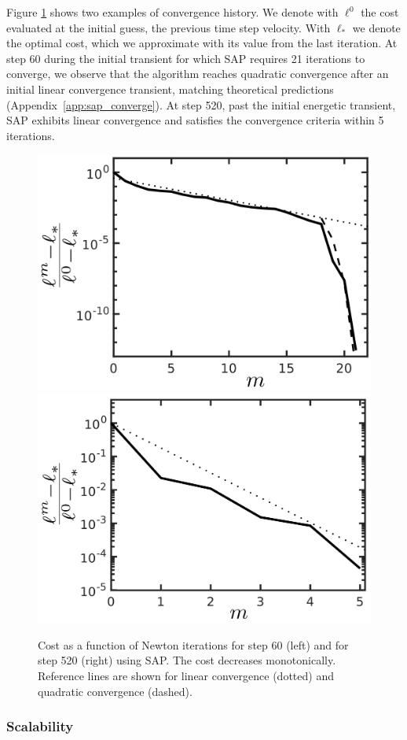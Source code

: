 Figure \ref{fig:clutter_line_search} shows two examples of convergence history.
We denote with $\ell^0$ the cost evaluated at the initial guess, the previous
time step velocity. With $\ell_*$ we denote the optimal cost, which we
approximate with its value from the last iteration. At step 60 during the
initial transient for which SAP requires 21 iterations to converge, we observe
that the algorithm reaches quadratic convergence after an initial linear
convergence transient, matching theoretical predictions
(Appendix~\ref{app:sap_converge}). At step 520, past the initial energetic
transient, SAP exhibits linear convergence and satisfies the convergence
criteria within 5 iterations.
\begin{figure}[!h]
	\centering
    \includegraphics[height=0.34\columnwidth]{figures/clutter/normalized_cost_step60_21its_wwalls_latex_labels.png}
	\includegraphics[height=0.34\columnwidth]{figures/clutter/normalized_cost_step520_5its_wwalls_latex_labels.png}    
	\caption{\label{fig:clutter_line_search} 
	Cost as a function of Newton iterations for step 60 (left) and for step 520
	(right) using SAP. The cost decreases monotonically. Reference lines are
	shown for linear convergence (dotted) and quadratic convergence (dashed).}
\end{figure}

\subsubsection{Scalability}

